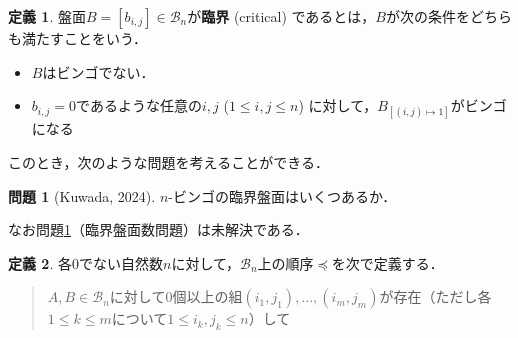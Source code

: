 \documentclass[uplatex,a4paper,dvipdfmx]{jsarticle}
\theoremstyle{definition}
\newtheorem{dfn}{定義}
\newtheorem{question}{問題}
\newcommand{\board}{\mathcal{B}}
\begin{document}
\begin{dfn}
    盤面$B = [b_{i, j}] \in \board_n$が\textbf{臨界} (critical) であるとは，$B$が次の条件をどちらも満たすことをいう．
    \begin{itemize}
        \item $B$はビンゴでない．
        \item $b_{i, j} = 0$であるような任意の$i, j$ ($1 \le i, j \le n$) に対して，$B_{[(i, j) \mapsto 1]}$がビンゴになる
    \end{itemize}
\end{dfn}

このとき，次のような問題を考えることができる．
\begin{screen}
\begin{question}[Kuwada, 2024] \label{question:kuwada}
    $n$-ビンゴの臨界盤面はいくつあるか．
\end{question}
\end{screen}
なお問題\ref{question:kuwada}（臨界盤面数問題）は未解決である．

\newpage

\begin{dfn}
    各0でない自然数$n$に対して，$\board_n$上の順序$\preceq$を次で定義する．
    \begin{quote}
        $A, B \in \board_n$に対して$0$個以上の組$(i_1, j_1), \ldots, (i_m, j_m)$が存在（ただし各$1 \le k \le m$について$1 \le i_k, j_k \le n$）して
    \end{quote}
\end{dfn}
\end{document}
